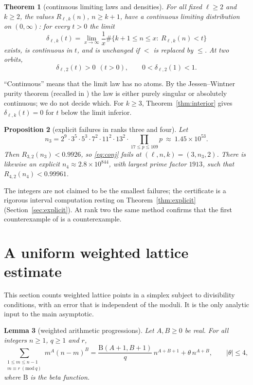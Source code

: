 \documentclass[11pt,a4paper]{article}
\newtheorem{theorem}{Theorem}[section]
\newtheorem{lemma}[theorem]{Lemma}
\newtheorem{proposition}[theorem]{Proposition}
\theoremstyle{remark}
\numberwithin{equation}{section}
\begin{document}
\begin{theorem}[continuous limiting laws and densities]\label{thm:laws}
For all fixed $\ell\ge2$ and $k\ge2$, the values $R_{\ell,k}(n)$, $n\ge k+1$, have a continuous limiting distribution on $(0,\infty)$: for every $t>0$ the limit
\begin{equation}\label{eq:delta}
\delta_{\ell,k}(t)=\lim_{x\to\infty}\frac1x\#\{k+1\le n\le x:\ R_{\ell,k}(n)<t\}
\end{equation}
exists, is continuous in $t$, and is unchanged if $<$ is replaced by $\le$. At two orbits,
\begin{equation}\label{eq:delta2}
\delta_{\ell,2}(t)>0\ \ (t>0),\qquad 0<\delta_{\ell,2}(1)<1 .
\end{equation}
\end{theorem}
``Continuous'' means that the limit law has no atoms. By the Jessen--Wintner purity theorem (recalled in \cite{TenenbaumVerwee}) the law is either purely singular or absolutely continuous; we do not decide which. For $k\ge3$, Theorem~\ref{thm:interior} gives $\delta_{\ell,k}(t)=0$ for $t$ below the limit inferior.

\begin{proposition}[explicit failures in ranks three and four]\label{prop:explicit}
Let
\[
n_3=2^{9}\cdot3^{5}\cdot5^{3}\cdot7^{2}\cdot11^{2}\cdot13^{2}\cdot\prod_{17\le p\le109}p\ \approx\ 1.45\times10^{53}.
\]
Then $R_{3,2}(n_3)<0.9926$, so \eqref{eq:conj} fails at $(\ell,n,k)=(3,n_3,2)$. There is likewise an explicit $n_4\approx 2.8\times10^{844}$, with largest prime factor $1913$, such that $R_{4,2}(n_4)<0.99961$.
\end{proposition}
The integers are not claimed to be the smallest failures; the certificate is a rigorous interval computation resting on Theorem~\ref{thm:explicit} (Section~\ref{sec:explicit}). At rank two the same method confirms that the first counterexample of \cite{CHS2026} is a counterexample.

\section{A uniform weighted lattice estimate}\label{sec:lattice}

This section counts weighted lattice points in a simplex subject to divisibility conditions, with an error that is independent of the moduli. It is the only analytic input to the main asymptotic.

\begin{lemma}[weighted arithmetic progressions]\label{lem:ap}
Let $A,B\ge0$ be real. For all integers $n\ge1$, $q\ge1$ and $r$,
\begin{equation}\label{eq:ap}
\sum_{\substack{1\le m\le n-1\\ m\equiv r\ (\mathrm{mod}\ q)}}m^A(n-m)^B=\frac{\mathrm B(A+1,B+1)}{q}\,n^{A+B+1}+\theta\,n^{A+B},\qquad|\theta|\le4,
\end{equation}
where $\mathrm B$ is the beta function.
\end{lemma}
\end{document}
